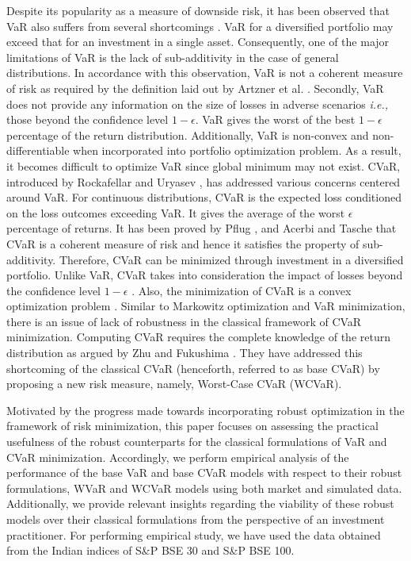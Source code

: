 \documentclass[12pt]{article}
\numberwithin{equation}{section}
\begin{document}
Despite its popularity as a measure of downside risk, it has been observed that VaR also suffers from several shortcomings \cite{Capinski_risk,Lim,Zhu}. VaR for a diversified portfolio may exceed that for an investment in a single asset. Consequently, one of the major limitations of VaR is the lack of sub-additivity in the case of general distributions. In accordance with this observation, VaR is not a coherent measure of risk as required by the definition laid out by Artzner et al. \cite{Artzner}. Secondly, VaR does not provide any information on the size of losses in adverse scenarios \textit{i.e.,} those beyond the confidence level $1-\epsilon$. VaR gives the worst of the best $1-\epsilon$ percentage of the return distribution.
Additionally, VaR is non-convex and non-differentiable when incorporated into portfolio optimization problem. As a result, it becomes difficult to optimize VaR since global minimum may not exist. CVaR, introduced by Rockafellar and Uryasev \cite{Rockafellar1,Rockafellar2}, has addressed various concerns centered around VaR. For continuous distributions, CVaR is the expected loss conditioned on the loss outcomes exceeding VaR. It gives the average of the worst $\epsilon$ percentage of returns. It has been proved by Pflug \cite{Pflug}, and Acerbi and Tasche \cite{Acerbi} that CVaR is a coherent measure of risk and hence it satisfies the property of sub-additivity. Therefore, CVaR can be minimized through investment in a diversified portfolio. Unlike VaR, CVaR takes into consideration the impact of losses beyond the confidence level $1-\epsilon$ \cite{Capinski_risk}. Also, the minimization of CVaR is a convex optimization problem \cite{Lim}. Similar to Markowitz optimization and VaR minimization, there is an issue of lack of robustness in the classical framework of CVaR minimization. Computing CVaR requires the complete knowledge of the return distribution as argued by Zhu and Fukushima \cite{Zhu}. They have addressed this shortcoming of the classical CVaR (henceforth, referred to as base CVaR) by proposing a new risk measure, namely, Worst-Case CVaR (WCVaR).

Motivated by the progress made towards incorporating robust optimization in the framework of risk minimization, this paper focuses on assessing the practical usefulness of the robust counterparts for the classical formulations of VaR and CVaR minimization. Accordingly, we perform empirical analysis of the performance of the base VaR and base CVaR models with respect to their robust formulations, WVaR and WCVaR models using both market and simulated data. Additionally, we provide relevant insights regarding the viability of these robust models over their classical formulations from the perspective of an investment practitioner. For performing empirical study, we have used the data obtained from the Indian indices of
S\&P BSE 30 and S\&P BSE 100.
\end{document}
